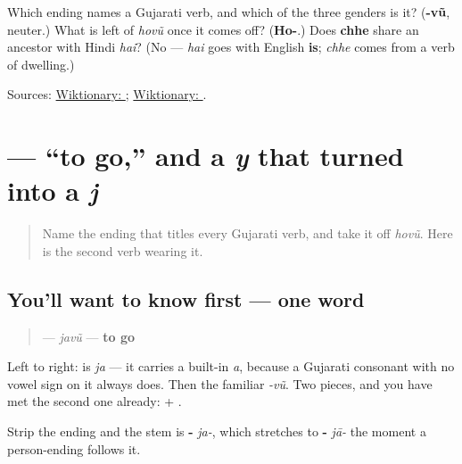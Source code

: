 \begin{tcolorbox}[breakable,colback=teal!4,colframe=teal!35!black,title={Before you move on}]
Which ending names a Gujarati verb, and which of the three genders is it? (\textbf{-vũ}, neuter.) What is left of \emph{hovũ} once it comes off? (\textbf{Ho-}.) Does \textbf{chhe} share an ancestor with Hindi \emph{hai}? (No — \emph{hai} goes with English \textbf{is}; \emph{chhe} comes from a verb of dwelling.)

Sources: \href{https://en.wiktionary.org/wiki/\%E0\%AA\%B9\%E0\%AB\%8B\%E0\%AA\%B5\%E0\%AB\%81\%E0\%AA\%82}{Wiktionary: }; \href{https://en.wiktionary.org/wiki/\%E0\%AA\%9B\%E0\%AB\%87}{Wiktionary: }.
\end{tcolorbox}
\section[javũ]{ — \textquotedblleft{}to go,\textquotedblright{} and a \emph{y} that turned into a \emph{j}}

\label{lesson:GU-C07-javun}



\begin{quote}
Name the ending that titles every Gujarati verb, and take it off \emph{hovũ}. Here is the second verb wearing it.
\end{quote}

\subsection*{You'll want to know first — one word}
\begin{quote}
\textbf{} — \emph{javũ} — \textbf{to go}
\end{quote}

Left to right: \textbf{} is \emph{ja} — it carries a built-in \emph{a}, because a Gujarati consonant with no vowel sign on it always does. Then the familiar \textbf{} \emph{-vũ}. Two pieces, and you have met the second one already: \textbf{} + \textbf{}.

Strip the ending and the stem is \textbf{-} \emph{ja-}, which stretches to \textbf{-} \emph{jā-} the moment a person-ending follows it.

